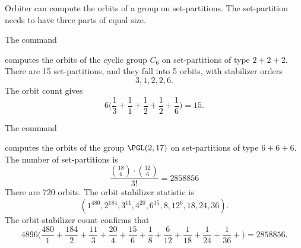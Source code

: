 Orbiter can compute the orbits of a group on set-partitions. 
The set-partition needs to have three parts of equal size.

\bigskip




The command


computes the orbits of the cyclic group $C_6$ on set-partitions of type $2+2+2$.
There are 15 set-partitions, 
and they fall into 5 orbits, with stabilizer orders
$$
3,1,2,2,6.
$$
The orbit count gives 
$$
6\Big(
\frac{1}{3}+
\frac{1}{1}+
\frac{1}{2}+
\frac{1}{2}+
\frac{1}{6}
\Big)
=15.
$$

\bigskip


The command


computes the orbits of the  group $\PGL(2,17)$ on set-partitions of type $6+6+6$.
The number of set-partitions is 
$$
\frac{{18 \choose 6} \cdot {12 \choose 6}}{3!}
=2858856
$$
There are 720 orbits. The orbit stabilizer statistic is 
$$
( 1^{480}, 2^{184}, 3^{11}, 4^{20}, 6^{15}, 8, 12^6, 18, 24, 36 ).
$$
The orbit-stabilizer count confirms that
$$
4896
\Big(
\frac{480}{1}+
\frac{184}{2}+
\frac{11}{3}+
\frac{20}{4}+
\frac{15}{6}+
\frac{1}{8}+
\frac{6}{12}+
\frac{1}{18}+
\frac{1}{24}+
\frac{1}{36}+
\Big)
=2858856.
$$
